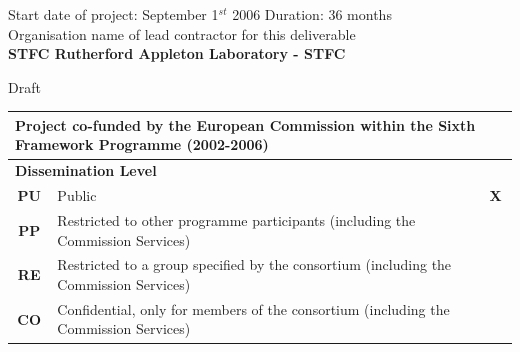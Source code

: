 \documentclass[a4paper,11pt]{article}
\begin{document}
\vspace*{\baselineskip}\noindent
{Start date of project: September 1$^{st}$} 2006 \hfill {Duration: 36 months}\\

\vspace{2\baselineskip}\noindent
Organisation name of lead contractor for this deliverable\\
{\bf STFC Rutherford Appleton Laboratory - STFC}
\begin{flushright} 
Draft
\end{flushright}

\vspace{\baselineskip}
\begin{table}[hb]
\begin{tabular}{||c|l|l||} \hline\hline
\multicolumn{3}{||l||}{\small Project co-funded by the European Commission within the Sixth Framework Programme (2002-2006)}\\ \hline
\multicolumn{3}{||l||}{\bf Dissemination Level}\\ \hline
\bf PU &\small Public\hfill~& \bf X \\ \hline
\bf PP &\small Restricted to other programme participants (including the Commission Services)& \\ \hline 
\bf RE &\small Restricted to a group specified by the consortium (including the Commission Services)&  \\ \hline
\bf CO &\small Confidential, only for members of the consortium (including the Commission Services)&  \\ \hline \hline
\end{tabular}
\end{table}
\pagebreak

\tableofcontents
\pagebreak
\end{document}
